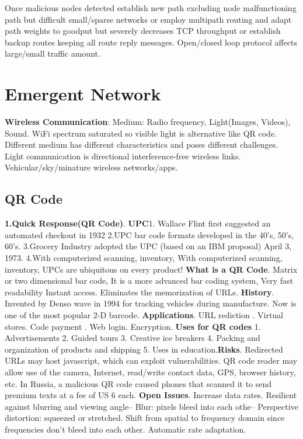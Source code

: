 \documentclass[9pt]{extarticle}
\begin{document}
\begin{multicols}{2}
Once malicious nodes detected establish new path excluding node malfunctioning path but difficult small/sparse networks or employ multipath routing and adapt path weights to goodput but severely decreases TCP throughput or establish backup routes keeping all route reply messages. Open/closed loop protocol affects large/small traffic amount.

\section{Emergent Network}

\textbf{Wireless Communication}: Medium: Radio frequency, Light(Images, Videos), Sound. WiFi spectrum saturated so visible light is alternative like QR code. Different medium has different characteristics and poses different challenges. Light communication is directional interference-free wireless links. Vehicular/sky/minature wireless networks/apps.

\subsection{QR Code}

\textbf{1.Quick Response(QR Code)}. \textbf{UPC}1. Wallace Flint first suggested an automated checkout in 1932 2.UPC bar code formats developed in the 40’s, 50’s, 60’s. 3.Grocery Industry adopted the UPC (based on an IBM proposal) April 3, 1973. 4.With computerized scanning, inventory, With computerized scanning, inventory, UPCs are ubiquitous on every product! \textbf{What is a QR Code}. Matrix or two dimensional bar code, It is a more advanced bar coding system, Very fast readability Instant access. Eliminates the memorization of URLs. \textbf{History}. Invented by Denso wave in 1994 for tracking vehicles during manufacture. Now is one of the most popular 2-D barcode. \textbf{Applications}. URL rediction . Virtual stores. Code payment . Web login. Encryption. \textbf{Uses for QR codes} 1. Advertisements 2. Guided tours 3. Creative ice breakers 4. Packing and organization of products and shipping 5. Uses in education.\textbf{Risks}. Redirected URLs may host javascript, which can exploit vulnerabilities. QR code reader may allow use of the camera, Internet, read/write contact data, GPS, browser history, etc. In Russia, a malicious QR code caused phones that scanned it to send premium texts at a fee of US 6 each.\textbf{ Open Issues}. Increase data rates. Resilient against blurring and viewing angle– Blur: pixels bleed into each othe– Perspective distortion: squeezed or stretched. Shift from spatial to frequency domain since frequencies don't bleed into each other. Automatic rate adaptation.


\end{multicols}
\end{document}
